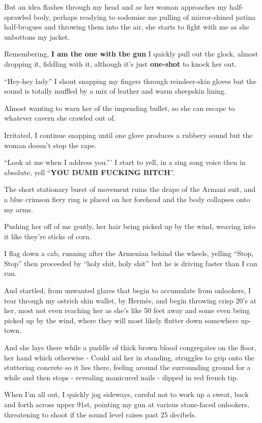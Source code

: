 \documentclass[19pt,openany]{book}
\begin{document}
But an idea flashes through my head and
as her woman approaches my half-sprawled body,
perhaps readying to sodomise me pulling of
mirror-shined patina half-brogues and throwing them
into the air, she starts to fight with me as she unbottons
my jacket.

Remembering, \textbf{I am the one
with the gun} I quickly pull out the glock,
almost dropping it, fiddling with it, although
it's just \textbf{one-shot} to knock her out.

``Hey-hey lady'' I shout
snapping my fingers through
reindeer-skin gloves
but the sound is totally
muffled by a mix of
leather and warm sheepskin lining.

Almost wanting to warn her of
the impending bullet, so she
can escape to whatever cavern she
crawled out of.

Irritated, I continue snapping
until one glove
produces a rubbery sound but
the woman doesn't stop the rape.

``Look at me
when I address you.''' I start
to yell, in a sing song voice
then in absolute, yell
``\textbf{YOU DUMB FUCKING BITCH}''.

The short stationary burst of
movement ruins the drape
of the Armani suit, and
a blue crimson fiery ring is placed
on her forehead and the body collapses onto
my arms.

Pushing her off of me gently, her hair being
picked up by the wind, weaving into it like
they're sticks of corn.

I flag down a cab, running after the
Armenian behind the wheels, yelling
``Stop, Stop'' then proceeded
by ``holy shit, holy shit''
but he is driving faster than I can run.

And startled, from unwanted
glares that begin to accumulate
from onlookers, I
tear through my ostrich skin
wallet, by
Hermès, and begin
throwing crisp 20's at her,
most not even
reaching her
as she's like 50 feet away and
some even being picked up by the
wind, where they will most
likely flutter down somewhere
up-town.

And she lays there while a
puddle of thick brown blood congregates on the floor,
her hand which otherwise - Could aid her in standing,
struggles to grip onto the stuttering concrete
so it lies there, feeling around
the surrounding ground
for a while and then stops - revealing
manicured nails - dipped in
red french tip.

When I'm all out,
I quickly jog sideways,
careful not to work up a sweat,
back and forth across
upper 91st, pointing
my gun
at various stone-faced
onlookers, threatening
to shoot if the sound
level raises past 25 decibels.
\end{document}
